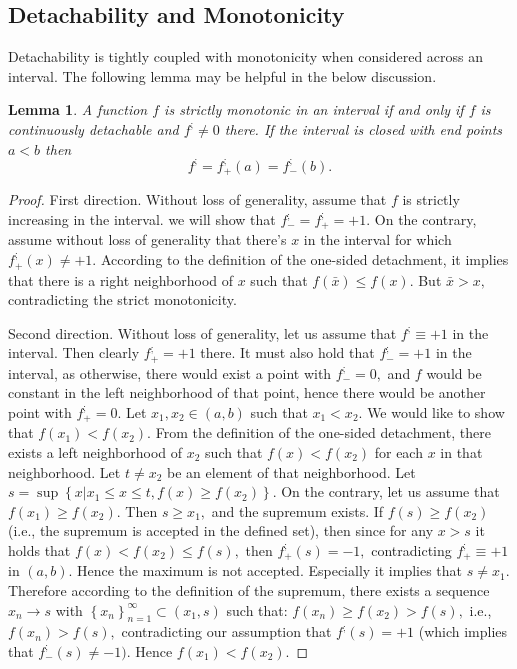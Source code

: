 \documentclass[11pt]{book}
\newtheorem{lem}[thm]{Lemma}
\begin{document}
\subsection{Detachability and Monotonicity}
Detachability is tightly coupled with monotonicity when considered across an interval. The following lemma may be helpful in the below discussion.

\begin{lem}\label{monotonicity}A function $f$ is strictly monotonic in an interval if and only if $f$ is continuously detachable and  $f^{;}\neq 0$ there. If the interval is closed with end points $a<b$ then $$f^{;}=f^{;}_{+}\left(a\right)=f^{;}_{-}\left(b\right).$$
\end{lem}
\begin{proof}First direction. Without loss of generality, assume that $f$ is strictly increasing in the interval. we will show that $f_{-}^{;}=f_{+}^{;}=+1.$ On the contrary, assume without loss of generality that there's $x$ in the interval for which $f_{+}^{;}\left(x\right)\neq+1.$ According to the definition of the one-sided detachment, it implies that there is a right neighborhood of $x$ such that $f\left(\bar{x}\right)\leq f\left(x\right).$ But $\bar{x}>x,$ contradicting the strict monotonicity.

Second direction. Without loss of generality, let us assume that $f^{;}\equiv+1$ in the interval. Then clearly $f_{+}^{;}=+1$ there. It must also hold that $f_{-}^{;}=+1$ in the interval, as otherwise, there would exist a point with $f_{-}^{;}=0,$ and $f$ would be constant in the left neighborhood of that point, hence there would be another point with $f_{+}^{;}=0.$
Let $x_{1},x_{2} \in \left( a,b \right)$ such that $x_{1}<x_{2}.$ We would like to show that $f\left(x_{1}\right)<f\left(x_{2}\right).$ From the definition of the one-sided detachment, there exists a left neighborhood of $x_{2}$ such that $f\left(x\right)<f\left(x_{2}\right)$ for each $x$ in that neighborhood. Let $t\neq x_{2}$ be an element of that neighborhood. Let $s=\sup\left\{ x|x_{1}\leq x\leq t,f\left(x\right)\geq f\left(x_{2}\right)\right\}.$ On the contrary, let us assume that $f\left(x_{1}\right)\geq f\left(x_{2}\right).$ Then $s\geq x_{1},$ and the supremum exists. If $f\left(s\right)\geq f\left(x_{2}\right)$ (i.e., the supremum is accepted in the defined set), then since for any $x>s$ it holds that $f\left(x\right)<f\left(x_{2}\right)\leq f\left(s\right),$ then $f_{+}^{;}\left(s\right)=-1,$ contradicting $f_{+}^{;}\equiv+1$ in $\left(a,b\right).$ Hence the maximum is not accepted. Especially it implies that $s\neq x_{1}.$ Therefore according to the definition of the supremum, there exists a sequence $x_{n}\rightarrow s$ with $\left\{ x_{n}\right\} _{n=1}^{\infty}\subset\left(x_{1},s\right)$ such that: $f\left(x_{n}\right)\geq f\left(x_{2}\right)>f\left(s\right),$ i.e., $f\left(x_{n}\right)>f\left(s\right),$ contradicting our assumption that $f^{;}\left(s\right)=+1$ (which implies that $f_{-}^{;}\left(s\right)\neq-1).$ Hence $f\left(x_{1}\right)<f\left(x_{2}\right).$


\end{proof}
\end{document}

